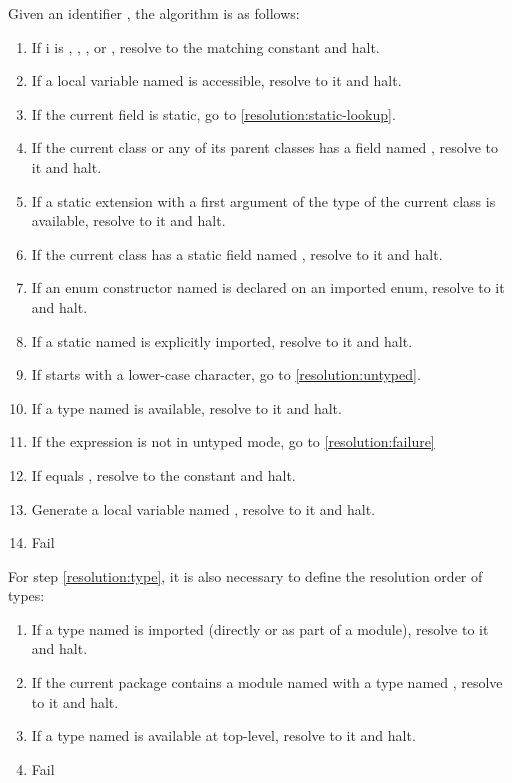 


Given an identifier , the algorithm is as follows:

\begin{enumerate}
	\item If i is , , ,  or , resolve to the matching constant and halt.
	\item If a local variable named  is accessible, resolve to it and halt.
	\item If the current field is static, go to \ref{resolution:static-lookup}.
	\item If the current class or any of its parent classes has a field named , resolve to it and halt.
	\item\label{resolution:static-extension} If a static extension with a first argument of the type of the current class is available, resolve to it and halt.
	\item\label{resolution:static-lookup} If the current class has a static field named , resolve to it and halt.
	\item\label{resolution:enum-ctor} If an enum constructor named  is declared on an imported enum, resolve to it and halt.
	\item If a static named  is explicitly imported, resolve to it and halt.
	\item If  starts with a lower-case character, go to \ref{resolution:untyped}.
	\item\label{resolution:type} If a type named  is available, resolve to it and halt.
	\item\label{resolution:untyped} If the expression is not in untyped mode, go to \ref{resolution:failure}
	\item If  equals , resolve to the  constant and halt.
	\item Generate a local variable named , resolve to it and halt.
	\item\label{resolution:failure} Fail
\end{enumerate}

For step \ref{resolution:type}, it is also necessary to define the resolution order of types:

\begin{enumerate}
	\item\label{resolution:import} If a type named  is imported (directly or as part of a module), resolve to it and halt.
	\item If the current package contains a module named  with a type named , resolve to it and halt.
	\item If a type named  is available at top-level, resolve to it and halt.
	\item Fail
\end{enumerate}

